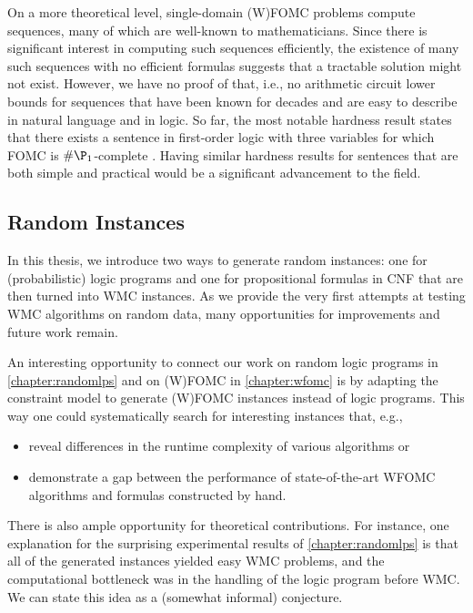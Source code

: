 On a more theoretical level, single-domain (W)FOMC problems compute sequences,
many of which are well-known to mathematicians. Since there is significant
interest in computing such sequences efficiently, the existence of many such
sequences with no efficient formulas suggests that a tractable solution might
not exist. However, we have no proof of that, i.e., no arithmetic circuit lower
bounds for sequences that have been known for decades and are easy to describe
in natural language and in logic. So far, the most notable hardness result
states that there exists a sentence in first-order logic with three variables
for which FOMC is $\#\P_1$-complete \citep{DBLP:conf/pods/BeameBGS15}. Having
similar hardness results for sentences that are both simple and practical would
be a significant advancement to the field.

\subsection{Random Instances}

In this thesis, we introduce two ways to generate random instances: one for
(probabilistic) logic programs and one for propositional formulas in CNF that
are then turned into WMC instances. As we provide the very first attempts at
testing WMC algorithms on random data, many opportunities for improvements and
future work remain.

An interesting opportunity to connect our work on random
logic programs in \cref{chapter:randomlps} and on (W)FOMC in
\cref{chapter:wfomc} is by adapting the constraint model to generate (W)FOMC
instances instead of logic programs. This way one could systematically search
for interesting instances that, e.g.,
\begin{itemize}
  \item reveal differences in the runtime complexity of various algorithms or
  \item demonstrate a gap between the performance of state-of-the-art WFOMC
        algorithms and formulas constructed by hand.
\end{itemize}

There is also ample opportunity for theoretical contributions. For instance, one
explanation for the surprising experimental results of \cref{chapter:randomlps}
is that all of the generated instances yielded easy WMC problems, and the
computational bottleneck was in the handling of the logic program before WMC\@.
We can state this idea as a (somewhat informal) conjecture.

